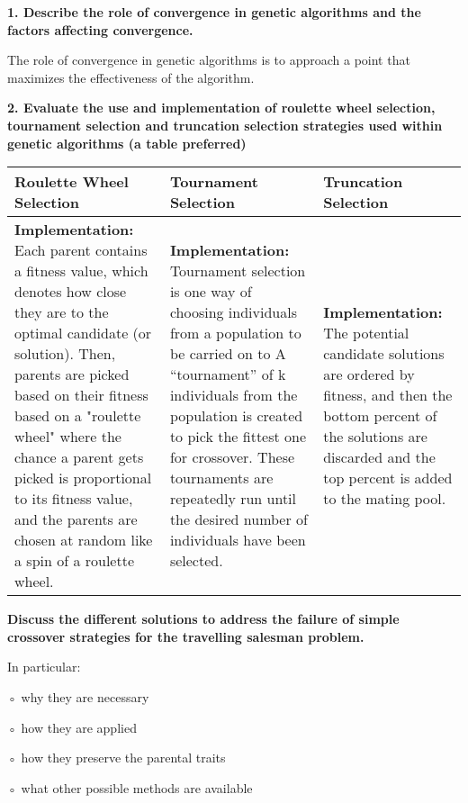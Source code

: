 \documentclass[12pt]{article}
\newenvironment{boldenv}
  {\bfseries}%
  {\medskip}%
\begin{document}
\textbf{1. Describe the role of convergence in genetic algorithms and the factors affecting convergence.}

\medskip

The role of convergence in genetic algorithms is to approach a point that maximizes the effectiveness of the algorithm.

\bigskip

\textbf{2. Evaluate the use and implementation of roulette wheel selection, tournament selection and truncation selection strategies used within genetic algorithms (a table preferred)}

\begin{table}[H]
	\def\arraystretch{1.5}
	\begin{tabularx}{\linewidth}{|
			>{\RaggedRight}X|
			>{\RaggedRight}X|
			>{\RaggedRight}X|
		}
		\hline
		\textbf{Roulette Wheel Selection}
		 &
		\textbf{Tournament Selection}
		 &
		\textbf{Truncation Selection}
		\\\hline

		\textbf{Implementation:} Each parent contains a fitness value, which denotes how close they are to the
		optimal candidate (or solution). Then, parents are picked based on their
		fitness based on a "roulette wheel" where the chance a parent gets picked is proportional to its fitness value, and the parents are chosen at random like a spin of a roulette wheel.

		 &

		\textbf{Implementation:} Tournament selection is one way of choosing individuals from a population to be carried on to
		A ``tournament''
		of k individuals from the population is created to pick the fittest one for crossover. These tournaments
		are repeatedly run until the desired number of individuals have been selected.

		 &

		\textbf{Implementation:} The potential candidate solutions are ordered by fitness, and then the bottom percent of the solutions are discarded and the top percent is added to the mating pool.

		\\\hline
	\end{tabularx}
\end{table}

\begin{boldenv}
	Discuss the different solutions to address the failure of simple crossover strategies for the travelling salesman problem.

	In particular:

	◦ why they are necessary

	◦ how they are applied

	◦ how they preserve the parental traits

	◦ what other possible methods are available
\end{boldenv}
\end{document}
